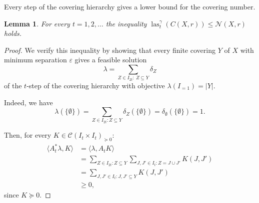 \documentclass{amsart}
\newtheorem{lemma}[defin]{Lemma}
\DeclareMathOperator{\las}{las}
\begin{document}
\medskip

%

Every step of the covering hierarchy gives a lower bound for the
covering number.

\begin{lemma}
  For every $t = 1, 2, \ldots$ the inequality
  $\las^\gamma_t(C(X,r)) \leq \mathcal{N}(X,r)$ holds.
\end{lemma}

\begin{proof}
  We verify this inequality by showing that every finite covering $Y$
  of $X$ with minimum separation $\varepsilon$ gives a feasible solution
\[
\lambda = \sum_{Z\in I_{2t}:\ Z\subseteq Y}\delta_Z
\]
of the $t$-step of the covering hierarchy with objective
$\lambda(I_{=1}) = |Y|$.

Indeed, we have
\[
  \lambda\left(\{\emptyset\}\right) =\sum_{Z\in I_{2t}: Z\subseteq
    Y}\delta_Z
  \left(\{\emptyset\}\right)=\delta_{\emptyset}\left(\{\emptyset\}\right)=1.
\]

Then, for every $K \in \mathcal{C}(I_t\times I_t)_{\succeq 0}$:
\[
\begin{split}
		\langle A_t^* \lambda ,K \rangle & = \langle \lambda,A_t K\rangle\\
		& = \sum_{Z\in I_{2t} :Z\subseteq Y} \sum_{J,J'\in I_t
                  : Z = J\cup J'} K(J,J')\\
		& = \sum_{J,J'\in I_t : J,J'\subseteq Y} K(J,J')\\
                & \geq 0,
\end{split}
\]
since $K\succeq 0$.


\end{proof}
\end{document}
